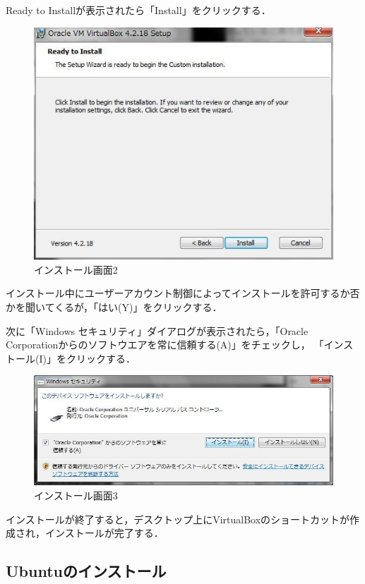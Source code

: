 \clearpage
Ready to Installが表示されたら「Install」をクリックする．
\begin{figure}[htb]
\centering
\includegraphics[width=15cm]{setup2.png}
\caption{インストール画面2}\label{virtualboxインストール画面2}
\end{figure}

インストール中にユーザーアカウント制御によってインストールを許可するか否かを聞いてくるが，「はい(Y)」をクリックする．

\clearpage
次に「Windows セキュリティ」ダイアログが表示されたら，「Oracle Corporationからのソフトウエアを常に信頼する(A)」をチェックし，
「インストール(I)」をクリックする．

\begin{figure}[htb]
\centering
\includegraphics[width=15cm]{setup3.png}
\caption{インストール画面3}\label{virtualboxインストール画面3}
\end{figure}
インストールが終了すると，デスクトップ上にVirtualBoxのショートカットが作成され，インストールが完了する．


\clearpage


\subsection{Ubuntuのインストール}

